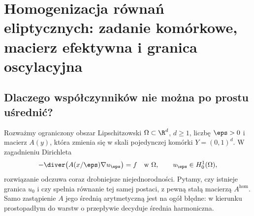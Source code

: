\chapter[Homogenizacja okresowa równań eliptycznych]{Homogenizacja równań eliptycznych: zadanie komórkowe, macierz efektywna i granica oscylacyjna}
\label{chap:pde30}

\section{Dlaczego współczynników nie można po prostu uśrednić?}
Rozważmy ograniczony obszar Lipschitzowski $\Omega\subset\R^d$, $d\ge1$,
liczbę $\eps>0$ i macierz $A(y)$, która zmienia się w skali
pojedynczej komórki $Y=(0,1)^d$. W zagadnieniu Dirichleta
\begin{equation}\label{eq:pde30-micro}
 -\diver\bigl(A(x/\eps)\nabla u_\eps\bigr)=f\quad\text{w }\Omega,
 \qquad u_\eps\in H_0^1(\Omega),
\end{equation}
rozwiązanie odczuwa coraz drobniejsze niejednorodności. Pytamy,
czy istnieje granica $u_0$ i czy spełnia równanie tej samej postaci,
z pewną stałą macierzą $A^{\mathrm{hom}}$. Samo zastąpienie $A$
jego średnią arytmetyczną jest na ogół błędne: w kierunku
prostopadłym do warstw o przepływie decyduje średnia harmoniczna.

